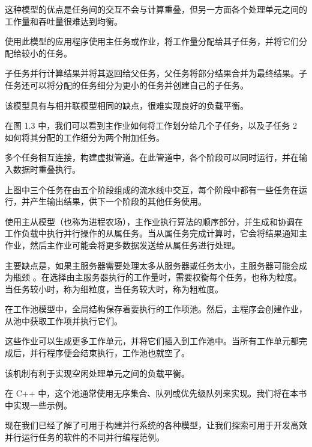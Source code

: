 
这种模型的优点是任务间的交互不会与计算重叠，但另一方面各个处理单元之间的工作量和吞吐量很难达到均衡。


使用此模型的应用程序使用主任务或作业，将工作量分配给其子任务，并将它们分配给较小的任务。

子任务并行计算结果并将其返回给父任务，父任务将部分结果合并为最终结果。子任务还可以将分配的任务细分为更小的任务并创建自己的子任务。

该模型具有与相并联模型相同的缺点，很难实现良好的负载平衡。


在图 1.3 中，我们可以看到主作业如何将工作划分给几个子任务，以及子任务 2 如何将其分配的工作细分为两个附加任务。


多个任务相互连接，构建虚拟管道。在此管道中，各个阶段可以同时运行，并在输入数据时重叠执行。


上图中三个任务在由五个阶段组成的流水线中交互，每个阶段中都有一些任务在运行，并产生输出结果，供下一个阶段的其他任务使用。


使用主从模型（也称为进程农场），主作业执行算法的顺序部分，并生成和协调在工作负载中执行并行操作的从属任务。当从属任务完成计算时，它会将结果通知主作业，然后主作业可能会将更多数据发送给从属任务进行处理。


主要缺点是，如果主服务器需要处理太多从服务器或任务太小，主服务器可能会成为瓶颈
。在选择由主服务器执行的工作量时，需要权衡每个任务，也称为粒度。当任务较小时，称为细粒度，当任务较大时，称为粗粒度。


在工作池模型中，全局结构保存着要执行的工作项池。然后，主程序会创建作业，从池中获取工作项并执行它们。

这些作业可以生成更多工作单元，并将它们插入到工作池中。当所有工作单元都完成后，并行程序便会结束执行，工作池也就空了。


该机制有利于实现空闲处理单元之间的负载平衡。

在 C++ 中，这个池通常使用无序集合、队列或优先级队列来实现。我们将在本书中实现一些示例。

现在我们已经了解了可用于构建并行系统的各种模型，让我们探索可用于开发高效并行运行任务的软件的不同并行编程范例。





























